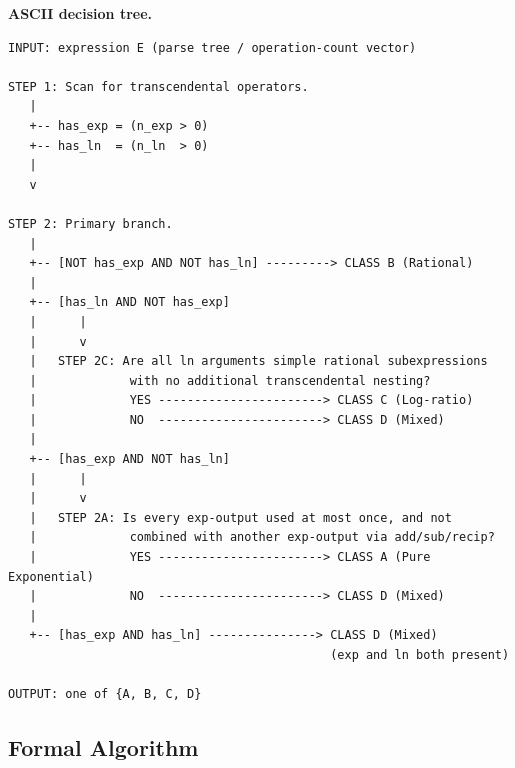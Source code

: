 \documentclass[12pt,a4paper]{article}
\theoremstyle{definition}
\begin{document}
\bigskip
\noindent\textbf{ASCII decision tree.}

\begin{verbatim}
INPUT: expression E (parse tree / operation-count vector)

STEP 1: Scan for transcendental operators.
   |
   +-- has_exp = (n_exp > 0)
   +-- has_ln  = (n_ln  > 0)
   |
   v

STEP 2: Primary branch.
   |
   +-- [NOT has_exp AND NOT has_ln] ---------> CLASS B (Rational)
   |
   +-- [has_ln AND NOT has_exp]
   |      |
   |      v
   |   STEP 2C: Are all ln arguments simple rational subexpressions
   |             with no additional transcendental nesting?
   |             YES -----------------------> CLASS C (Log-ratio)
   |             NO  -----------------------> CLASS D (Mixed)
   |
   +-- [has_exp AND NOT has_ln]
   |      |
   |      v
   |   STEP 2A: Is every exp-output used at most once, and not
   |             combined with another exp-output via add/sub/recip?
   |             YES -----------------------> CLASS A (Pure Exponential)
   |             NO  -----------------------> CLASS D (Mixed)
   |
   +-- [has_exp AND has_ln] ---------------> CLASS D (Mixed)
                                             (exp and ln both present)

OUTPUT: one of {A, B, C, D}
\end{verbatim}

\subsection{Formal Algorithm}
\label{subsec:algorithm}
\end{document}
